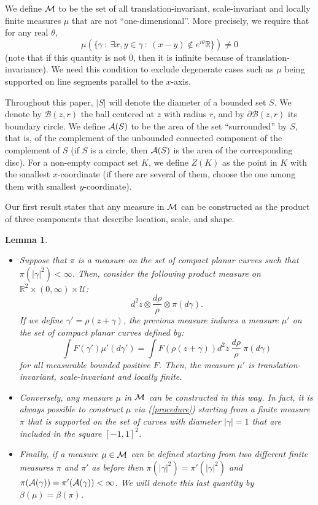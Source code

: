 \documentclass[11pt]{article}
\newcommand{\R}{{{\mathbb {R}}}}
\newtheorem {lemma} [Theorem]    {Lemma}
\newcommand{\cir}{\partial \B}
\newcommand{\B}{{\mathcal B}}
\begin{document}
We define ${\cal M}$ to be the set of all translation-invariant, 
scale-invariant and locally finite measures $\mu$ that are not ``one-dimensional''. 
More precisely, we require that for any real $\theta$, 
$$ 
\mu ( \{\gamma \ : \  \exists x , y  \in \gamma \ : \ (x-y) \notin e^{i \theta} \R \} )  \not= 0  
$$
(note that if this quantity is not $0$, then it is infinite because of translation-invariance). 
We need this condition to exclude degenerate cases such as $\mu$ being supported on line
segments parallel to the $x$-axis.

Throughout this paper, $|S|$ will denote the diameter of a bounded set $S$.
We denote by $\B(z,r)$ the ball centered at $z$ with radius $r$,
and by $\cir(z,r)$ its boundary circle.
We define ${\cal A} (S)$ to be the area of the set ``surrounded'' by $S$, 
that is, of the complement of the unbounded connected component of the complement of $S$
(if $S$ is a circle, then ${\cal A} (S)$ is the area of the corresponding disc). 
For a non-empty compact set $K$, we define $Z (K)$ as the point in $K$ 
with the smallest $x$-coordinate (if there are several of them, 
choose the one among them with smallest $y$-coordinate).

Our first result states that any measure in ${\cal M}$ can be constructed as
the product of three components that describe location, scale, and shape.

\begin {lemma} \label {l1}
\begin {itemize}
\item
Suppose that $\pi$ is a measure on the set of compact planar curves such that 
$\pi ( |\gamma|^2 ) < \infty$.
Then, consider the following product measure on 
$\R^2 \times (0, \infty) \times {\mathcal U}$:
 $$d^2 z \otimes \frac {d\rho }{\rho} \otimes \pi ( d\gamma).$$ 
If we define $\gamma' = \rho (z + \gamma)$, the previous measure induces 
a measure $\mu'$ on the set of compact planar curves defined by: 
\begin {equation}
\label {procedure}
\int F (\gamma') \mu' (d \gamma') = 
\int F ( \rho ( z + \gamma)) d^2 z \ \frac {d \rho} {\rho} \    \pi ( d\gamma) 
\end {equation}
for all measurable bounded positive $F$. 
Then, the measure $\mu'$ is translation-invariant, scale-invariant and locally finite.
\item
Conversely, any measure $\mu$ in ${\cal M}$ can be constructed in this way. 
In fact, it is always possible to construct 
$\mu$ via (\ref {procedure})  starting from a finite measure $\pi$ that is 
supported on the set of curves with diameter $|\gamma| = 1$ 
that are included in the square $[-1,1]^2$.
\item
Finally, if a measure $\mu \in {\cal M}$ can be defined starting 
from two different finite measures $\pi$ and $\pi'$ as before then 
$\pi ( |\gamma|^2) = \pi' ( |\gamma|^2)$ and 
$\pi ( {\cal A} ( \gamma ) ) = \pi' ({\cal A} ( \gamma) ) < \infty$.
We will denote this last quantity by $\beta ( \mu)= \beta (\pi)$.
\end {itemize}
\end {lemma}
\end{document}

